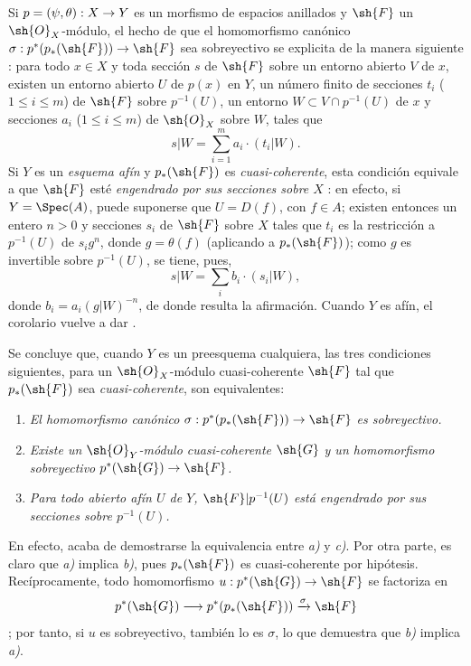 \documentclass[oneside,10pt]{amsart}
\makeatletter
\renewcommand{\leq}{\leqslant}
\newcommand{\ega@arrow}[2]{\mathchoice{#1}{#2}{#2}{#2}}
\renewcommand{\to}{\ega@arrow{\longrightarrow}{\rightarrow}}
\newcommand{\oldpage}[2][]{\marginnote{\normalfont\footnotesize\textbf{#1}~|~#2}\ignorespaces}
\let\EGAOriginalLabel\label
\renewcommand{\label}[1]{\phantomsection\EGAOriginalLabel{#1}}
\makeatother
\begin{document}
\begin{remarks}[3.4.7]
\label{II.3.4.7}
Si $p=(\psi,\theta):X\to Y$ es un morfismo de espacios anillados y $\sh{F}$ un $\sh{O}_X$-módulo, el hecho de que el homomorfismo canónico $\sigma:p^*(p_*(\sh{F}))\to\sh{F}$ sea sobreyectivo se explicita de la manera siguiente : para todo $x\in X$ y toda sección $s$ de $\sh{F}$ sobre un entorno abierto $V$ de $x$, existen un entorno abierto $U$ de $p(x)$ en $Y$, un número finito de secciones $t_i$ ($1\leq i\leq m$) de $\sh{F}$ sobre $p^{-1}(U)$, un entorno $W\subset V\cap p^{-1}(U)$ de $x$ y secciones $a_i$ ($1\leq i\leq m$) de $\sh{O}_X$ sobre $W$, tales que
\[
  s|W=\sum_{i=1}^m a_i\cdot(t_i|W).
\]
Si $Y$ es un \emph{esquema afín} y $p_*(\sh{F})$ es \emph{cuasi-coherente}, esta condición equivale a que $\sh{F}$ esté \emph{engendrado por sus secciones sobre $X$} : en efecto, si $Y=\Spec(A)$, puede suponerse que $U=D(f)$, con $f\in A$; existen entonces un entero $n>0$ y secciones $s_i$ de $\sh{F}$ sobre $X$ tales que $t_i$ es la restricción a $p^{-1}(U)$ de $s_ig^n$, donde $g=\theta(f)$ (aplicando  a $p_*(\sh{F})$); como $g$ es invertible sobre $p^{-1}(U)$, se tiene, pues,
\[
  s|W=\sum_i b_i\cdot(s_i|W),
\]
donde $b_i=a_i(g|W)^{-n}$, de donde resulta la afirmación.
Cuando $Y$ es afín, el corolario  vuelve a dar .

\oldpage[II]{61}
Se concluye que, cuando $Y$ es un preesquema cualquiera, las tres condiciones siguientes, para un $\sh{O}_X$-módulo cuasi-coherente $\sh{F}$ tal que $p_*(\sh{F})$ sea \emph{cuasi-coherente}, son equivalentes:
\begin{enumerate}
  \item[a)] \emph{El homomorfismo canónico $\sigma:p^*(p_*(\sh{F}))\to\sh{F}$ es sobreyectivo.}
  \item[b)] \emph{Existe un $\sh{O}_Y$-módulo cuasi-coherente $\sh{G}$ y un homomorfismo sobreyectivo $p^*(\sh{G})\to\sh{F}$.}
  \item[c)] \emph{Para todo abierto afín $U$ de $Y$, $\sh{F}|p^{-1}(U)$ está engendrado por sus secciones sobre $p^{-1}(U)$.}
\end{enumerate}

En efecto, acaba de demostrarse la equivalencia entre \emph{a)} y \emph{c)}.
Por otra parte, es claro que \emph{a)} implica \emph{b)}, pues $p_*(\sh{F})$ es cuasi-coherente por hipótesis.
Recíprocamente, todo homomorfismo $u:p^*(\sh{G})\to\sh{F}$ se factoriza en
\[
  p^*(\sh{G})\to p^*(p_*(\sh{F}))\xrightarrow{\sigma}\sh{F}
\]
; por tanto, si $u$ es sobreyectivo, también lo es $\sigma$, lo que demuestra que \emph{b)} implica \emph{a)}.
\end{remarks}
\end{document}
